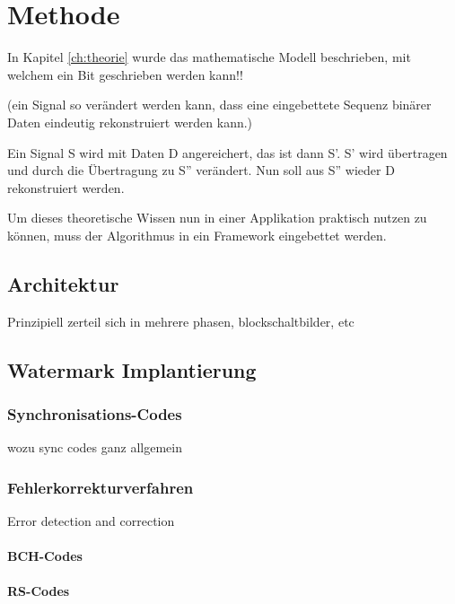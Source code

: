 \chapter{Methode}
\label{ch:methode}

In Kapitel \ref{ch:theorie} wurde das mathematische Modell beschrieben, mit welchem ein Bit geschrieben werden kann!!

(ein Signal so ver\"andert werden kann, dass eine eingebettete Sequenz bin\"arer Daten eindeutig rekonstruiert werden kann.)

Ein Signal S wird mit Daten D angereichert, das ist dann S'. S' wird übertragen und durch die Übertragung zu S'' verändert. Nun soll aus S'' wieder D rekonstruiert werden.

Um dieses theoretische Wissen nun in einer Applikation praktisch nutzen zu k\"onnen, muss der Algorithmus in ein Framework eingebettet werden. 

\section{Architektur}

Prinzipiell zerteil sich in mehrere phasen, blockschaltbilder, etc

\section{Watermark Implantierung}
\label{sec:embedding}

\subsection{Synchronisations-Codes}

wozu sync codes ganz allgemein

\subsection{Fehlerkorrekturverfahren}
\label{sec:errorcorrection}

Error detection and correction

\subsubsection{BCH-Codes}

\subsubsection{RS-Codes}


